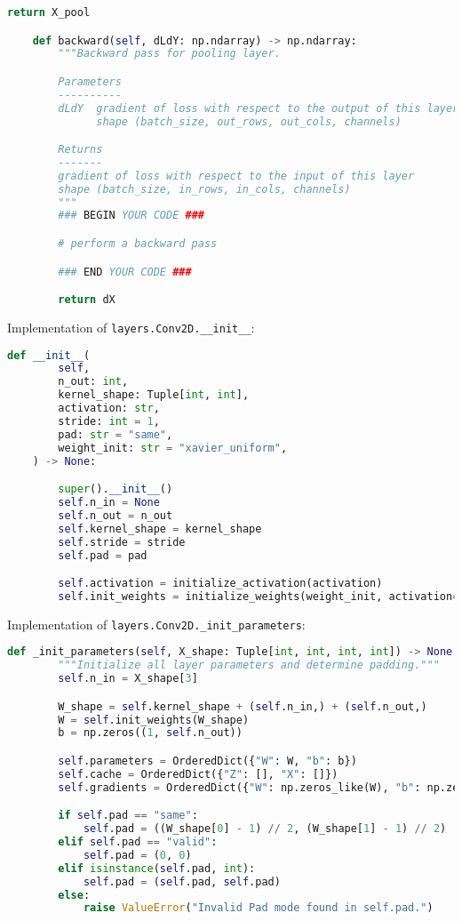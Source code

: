 \begin{lstlisting}[language=Python]
        return X_pool

    def backward(self, dLdY: np.ndarray) -> np.ndarray:
        """Backward pass for pooling layer.

        Parameters
        ----------
        dLdY  gradient of loss with respect to the output of this layer
              shape (batch_size, out_rows, out_cols, channels)

        Returns
        -------
        gradient of loss with respect to the input of this layer
        shape (batch_size, in_rows, in_cols, channels)
        """
        ### BEGIN YOUR CODE ###

        # perform a backward pass

        ### END YOUR CODE ###

        return dX

\end{lstlisting}

Implementation of \texttt{layers.Conv2D.__init__}:

\begin{lstlisting}[language=Python]
    def __init__(
        self,
        n_out: int,
        kernel_shape: Tuple[int, int],
        activation: str,
        stride: int = 1,
        pad: str = "same",
        weight_init: str = "xavier_uniform",
    ) -> None:

        super().__init__()
        self.n_in = None
        self.n_out = n_out
        self.kernel_shape = kernel_shape
        self.stride = stride
        self.pad = pad

        self.activation = initialize_activation(activation)
        self.init_weights = initialize_weights(weight_init, activation=activation)

\end{lstlisting}

Implementation of \texttt{layers.Conv2D._init_parameters}:

\begin{lstlisting}[language=Python]
    def _init_parameters(self, X_shape: Tuple[int, int, int, int]) -> None:
        """Initialize all layer parameters and determine padding."""
        self.n_in = X_shape[3]

        W_shape = self.kernel_shape + (self.n_in,) + (self.n_out,)
        W = self.init_weights(W_shape)
        b = np.zeros((1, self.n_out))

        self.parameters = OrderedDict({"W": W, "b": b})
        self.cache = OrderedDict({"Z": [], "X": []})
        self.gradients = OrderedDict({"W": np.zeros_like(W), "b": np.zeros_like(b)})

        if self.pad == "same":
            self.pad = ((W_shape[0] - 1) // 2, (W_shape[1] - 1) // 2)
        elif self.pad == "valid":
            self.pad = (0, 0)
        elif isinstance(self.pad, int):
            self.pad = (self.pad, self.pad)
        else:
            raise ValueError("Invalid Pad mode found in self.pad.")

\end{lstlisting}

